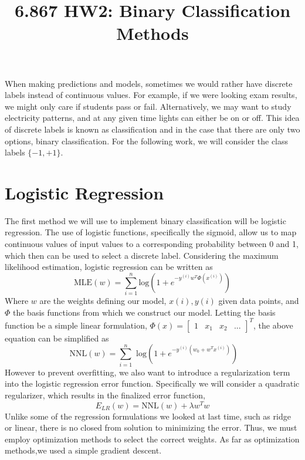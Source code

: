 \documentclass[12pt, twocolumn]{article}
\begin{document}
\title{6.867 HW2: Binary Classification Methods}
\maketitle
When making predictions and models, sometimes we would rather have discrete labels instead of continuous values. For example, if we were looking exam results, we might only care if students pass or fail. Alternatively, we may want to study electricity patterns, and at any given time lights can either be on or off. This idea of discrete labels is known as classification and in the case that there are only two options, binary classification. For the following work, we will consider the class labels $\{-1, +1\}$. 

\section{Logistic Regression}
 
 The first method we will use to implement binary classification will be logistic regression. The use of logistic functions, specifically the sigmoid, allow us to map continuous values of input values to a corresponding probability between 0 and 1, which then can be used to select a discrete label. Considering the maximum likelihood estimation, logistic regression can be written as 
 \begin{equation}
 \textrm{MLE}(w)= \sum_{i=1}^{n} \textrm{log}(1+e^{-y^{(i)}w^T \Phi(x^{(i)})})
 \end{equation}
 Where $w$ are the weights defining our model, $x(i), y(i)$ given data points, and $\Phi$ the basis functions from which we construct our model. Letting the basis function be a simple linear formulation, $\Phi(x)= \begin{bmatrix} 1 & x _1 & x_2 & ... \end{bmatrix}^T$, the above equation can be simplified as 
 \begin{equation}
\textrm{ NNL}(w)= \sum_{i=1}^{n}\textrm{ log}(1+e^{-y^{(i)}(w_0+w^Tx^{(i)})})
 \end{equation}
 However to prevent overfitting, we also want to introduce a regularization term into the logistic regression error function. Specifically we will consider a quadratic regularizer, which results in the finalized error function, 
 \begin{equation}
 E_{LR}(w)= \textrm{NNL}(w) +\lambda w^Tw
 \end{equation}
 Unlike some of the regression formulations we looked at last time, such as ridge or linear, there is no closed from solution to minimizing the error. Thus, we must employ optimization methods to select the correct weights. As far as optimization methods,we used a simple gradient descent. 
 
\end{document}
